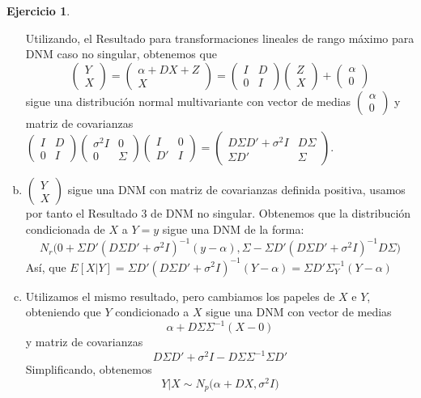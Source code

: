 \documentclass[12pt,spanish]{article}
\theoremstyle{definition}
\newtheorem{exercise}{Ejercicio}
\begin{document}
\begin{exercise}
\begin{enumerate}[a)]
    Utilizando, el Resultado para transformaciones lineales de rango
    máximo para DNM caso no singular, obtenemos que
    \[
      \begin{pmatrix}
        Y \\ X
      \end{pmatrix}=
      \begin{pmatrix}
        \alpha+DX+Z \\ X
      \end{pmatrix}=
      \begin{pmatrix}
        I & D \\ 0 & I
      \end{pmatrix}
      \begin{pmatrix}
        Z \\ X
      \end{pmatrix}+
      \begin{pmatrix}
        \alpha \\ 0
      \end{pmatrix}
    \]
    sigue una distribución normal multivariante con vector de medias $
    \begin{pmatrix}
      \alpha \\ 0
    \end{pmatrix}$ y matriz de covarianzas $
    \begin{pmatrix}
      I & D \\ 0 & I
    \end{pmatrix}\begin{pmatrix}
      \sigma^2I & 0 \\ 0 & \Sigma
    \end{pmatrix}\begin{pmatrix}
      I & 0 \\ D' & I
    \end{pmatrix}=
    \begin{pmatrix}
      D\Sigma D'+\sigma^2I & D\Sigma \\ \Sigma D' & \Sigma
    \end{pmatrix}$.
  \item $\begin{pmatrix}
      Y \\ X
    \end{pmatrix}$ sigue una DNM con matriz de covarianzas definida
    positiva, usamos por tanto el Resultado 3 de DNM no
    singular. Obtenemos que la distribución condicionada de $X$ a
    $Y=y$ sigue una DNM de la forma:
    \[N_r\Big(0+\Sigma D'(D\Sigma
      D'+\sigma^2I)^{-1}(y-\alpha),\Sigma-\Sigma D'(D\Sigma
      D'+\sigma^2I)^{-1}D\Sigma\Big)\] Así, que
    $E[X|Y]=\Sigma D'(D\Sigma D'+\sigma^2I)^{-1}(Y-\alpha)=\Sigma D'\Sigma_Y^{-1}(Y-\alpha)$
  \item Utilizamos el mismo resultado, pero cambiamos los papeles de
    $X$ e $Y$, obteniendo que $Y$ condicionado a $X$ sigue una DNM
    con vector de medias
    \[\alpha+D\Sigma\Sigma^{-1}(X-0)\]
    y matriz de covarianzas
    \[D\Sigma D'+\sigma^2I-D\Sigma\Sigma^{-1}\Sigma D'\]
    Simplificando, obtenemos
    \[Y|X\sim N_p\Big(\alpha+D X,\sigma^2I\Big)\]
  \end{enumerate}
\end{exercise}
\end{document}
